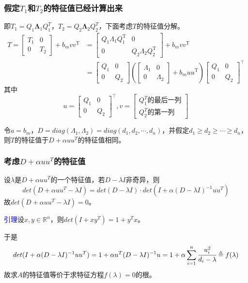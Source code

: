 \documentclass[notheorems,serif]{beamer}
\begin{document}
\begin{frame}
\frametitle{假定$T_1$和$T_2$的特征值已经计算出来}
即$T_1=Q_1\boldsymbol{\Lambda}_1Q_1^T$，$T_2=Q_2\boldsymbol{\Lambda}_2Q_2^T$，下面考虑$T$的特征值分解。
$$
\begin{aligned} T=\left[\begin{array}{cc}{T_{1}} & {0} \\ {0} & {T_{2}}\end{array}\right]+b_{m} v v^{\mathrm{T}} &=\left[\begin{array}{cc}{Q_{1} \Lambda_{1} Q_{1}^{\mathrm{T}}} & {0} \\ {0} & {Q_{2} \Lambda_{2} Q_{2}^{\mathrm{T}}}\end{array}\right]+b_{m} v v^{\mathrm{T}} \\ &=\left[\begin{array}{cc}{Q_{1}} & {0} \\ {0} & {Q_{2}}\end{array}\right]\left(\left[\begin{array}{cc}{\Lambda_{1}} & {0} \\ {0} & {\Lambda_{2}}\end{array}\right]+b_{m} u u^{\mathrm{T}}\right)\left[\begin{array}{cc}{Q_{1}} & {0} \\ {0} & {Q_{2}}\end{array}\right]^{\top} \end{aligned}
$$
其中$$
u=\left[\begin{array}{cc}{Q_{1}} & {0} \\ {0} & {Q_{2}}\end{array}\right]^{\top}
,v=\left[\begin{array}{c}
Q_1^T\mbox{的最后一列}\\Q_2^T\mbox{的第一列}
\end{array}\right]$$

令$a=b_m$，$D=diag(\Lambda_1,\Lambda_2)=diag(d_1,d_2,\cdots ,d_n)$，并假定$d_1\ge d_2\ge \cdots \ge d_n$，则$T$的特征值于$D+\alpha uu^T$的特征值相同。
\end{frame}
\begin{frame}
\frametitle{考虑$D+\alpha uu^T$的特征值}


设$\lambda$是$D+\alpha uu^T$的一个特征值，若$D-\lambda I$非奇异，则$$det(D+\alpha uu^T-\lambda I)=det(D-\lambda I)\cdot det(I+\alpha(D-\lambda I)^{-1}uu^T)$$
故$det(D+\alpha uu^T-\lambda I)=0$。

\textcolor{blue}{引理}\quad 设$x,y\in \mathbb R^n$，则$det(I+xy^T)=1+y^Tx$。

于是$$det(I+\alpha(D-\lambda I)^{-1}uu^T)=1+\alpha u^T(D-\lambda I)^{-1}u=1+\alpha \sum_{i=1}^{n}\cfrac{u_i^2}{d_i-\lambda} \triangleq f(\lambda)$$
故求$A$的特征值等价于求特征方程$f(\lambda)=0$的根。\\
\end{frame}
\end{document}
